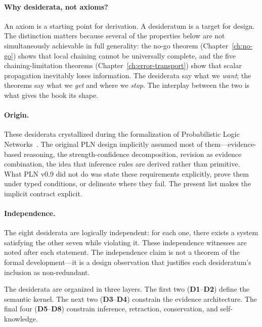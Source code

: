 \documentclass[11pt,openany]{report}
\begin{document}
\paragraph{Why desiderata, not axioms?}
An axiom is a starting point for derivation.  A desideratum is a
target for design.  The distinction matters because several of the
properties below are not simultaneously achievable in full generality:
the no-go theorem (Chapter~\ref{ch:no-go}) shows that local chaining
cannot be universally complete, and the five chaining-limitation
theorems (Chapter~\ref{ch:error-transport}) show that scalar
propagation inevitably loses information.  The desiderata say what
we \emph{want}; the theorems say what we \emph{get} and where we
\emph{stop}.  The interplay between the two is what gives the book
its shape.

\paragraph{Origin.}
These desiderata crystallized during the formalization of Probabilistic
Logic Networks~\cite{goertzel2009pln}.  The original PLN design
implicitly assumed most of them---evidence-based reasoning, the
strength-confidence decomposition, revision as evidence combination,
the idea that inference rules are derived rather than primitive.  What
PLN v0.9 did not do was state these requirements explicitly, prove them
under typed conditions, or delineate where they fail.  The present list
makes the implicit contract explicit.

\paragraph{Independence.}
The eight desiderata are logically independent: for each one, there
exists a system satisfying the other seven while violating it.  These
independence witnesses are noted after each statement.  The
independence claim is not a theorem of the formal development---it is a
design observation that justifies each desideratum's inclusion as
non-redundant.

\bigskip

The desiderata are organized in three layers.  The first two
(\textbf{D1}--\textbf{D2}) define the semantic kernel.  The next two
(\textbf{D3}--\textbf{D4}) constrain the evidence architecture.
The final four (\textbf{D5}--\textbf{D8}) constrain inference,
retraction, conservation, and self-knowledge.

\end{document}
